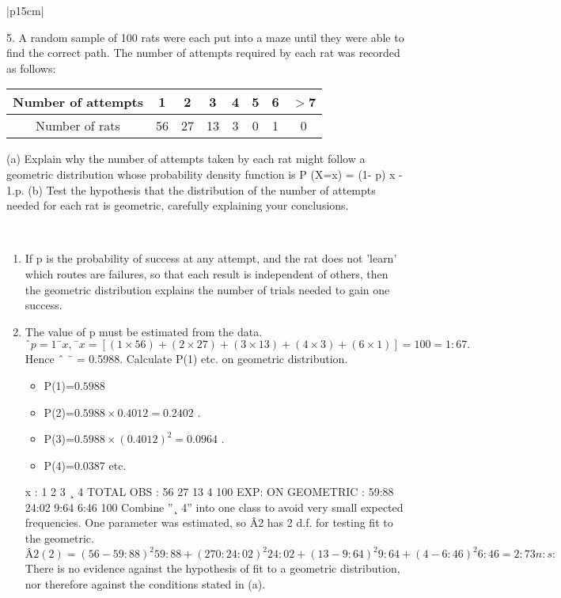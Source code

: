 \documentclass[a4paper,12pt]{article}
\begin{document}
\begin{table}[ht!]
 
\centering
 
\begin{tabular}{|p{15cm}|}
 
\hline  

5. A random sample of 100 rats were each put into a maze until they were able to find the correct path.  The number of attempts required by each rat was recorded as follows:
\begin{center}
\begin{tabular}{|c|c|c|c|c|c|c|c|}\hline
Number of attempts &  1& 2& 3 &4 &5 &6 & $>$7\\\hline
Number of rats& 56& 27& 13& 3 &0 &1& 0\\\hline
\end{tabular}
\end{center}
(a) Explain why the number of attempts taken by each rat might follow a geometric distribution whose probability density function is P (X=x) = (1- p) x - 1.p.
(b) Test the hypothesis that the distribution of the number of attempts needed for each rat is geometric, carefully explaining your conclusions.


\\ \hline
  
\end{tabular}

\end{table}


\begin{enumerate}
\item If p is the probability of success at any attempt, and the rat does not ’learn’ which routes are
failures, so that each result is independent of others, then the geometric distribution explains the
number of trials needed to gain one success.
\item The value of p must be estimated from the data.
\[ˆp = 1
¯x , ¯x = [(1 \times 56) + (2 \times 27) + (3 \times 13) + (4 \times 3) + (6 \times 1)]=100 = 1:67.\]
Hence ˆ ¯ = 0.5988. Calculate P(1) etc. on geometric distribution.
\begin{itemize}
    \item P(1)=$0.5988$ 
    \item P(2)=$0.5988\times0.4012=0.2402$ .
\item P(3)=$0.5988 \times (0.4012)^2=0.0964$ . 
\item P(4)=0.0387 etc.
\end{itemize}
x : 1 2 3 ¸ 4 TOTAL
OBS : 56 27 13 4 100
EXP: ON GEOMETRIC : 59:88 24:02 9:64 6:46 100
Combine ”¸ 4” into one class to avoid very small expected frequencies. One parameter was
estimated, so Â2 has 2 d.f. for testing fit to the geometric.
\[Â2
(2) =
(56 - 59:88)^2
59:88
+
(27 0: 24:02)^2
24:02
+
(13 - 9:64)^2
9:64
+
(4 - 6:46)^2
6:46
= 2:73 n:s:\]
There is no evidence against the hypothesis of fit to a geometric distribution, nor therefore against
the conditions stated in (a).
\end{enumerate}
\end{document}
